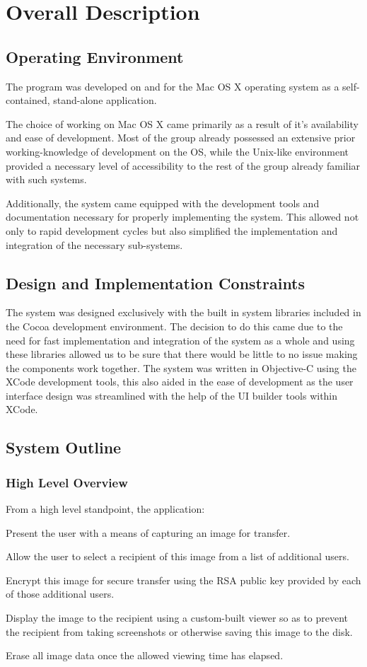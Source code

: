 \documentclass[11pt, a4paper,titlepage]{report}
\begin{document}
\chapter{Overall Description}
\section{Operating Environment}
The program was developed on and for the Mac OS X operating system as a self-contained, stand-alone application.

The choice of working on Mac OS X came primarily as a result of it's availability and ease of development. Most of the group already possessed an extensive prior working-knowledge of development on the OS, while the Unix-like environment provided a necessary level of accessibility to the rest of the group already familiar with such systems.

Additionally, the system came equipped with the development  tools and documentation necessary for properly implementing the system. This allowed not only to rapid development cycles but also simplified the implementation and integration of the necessary sub-systems.

\section{Design and Implementation Constraints}
The system was designed exclusively with the built in system libraries included in the Cocoa development environment. The decision to do this came due to the need for fast implementation and integration of the system as a whole and using these libraries allowed us to be sure that there would be little to no issue making the components work together. The system was written in Objective-C using the XCode development tools, this also aided in the ease of development as the user interface design was streamlined with the help of the UI builder tools within XCode.

\section{System Outline}
\subsection*{High Level Overview}
From a high level standpoint, the application:
\begin{itemize*}
	\item {Present the user with a means of capturing an image for transfer.}
	\item {Allow the user to select a recipient of this image from a list of additional users.}
	\item {Encrypt this image for secure transfer using the RSA public key provided by each of those additional users.}
	\item {Display the image to the recipient using a custom-built viewer so as to prevent the recipient from taking screenshots or otherwise saving this image to the disk.}
	\item {Erase all image data once the allowed viewing time has elapsed.}
\end{itemize*} 
\end{document}
